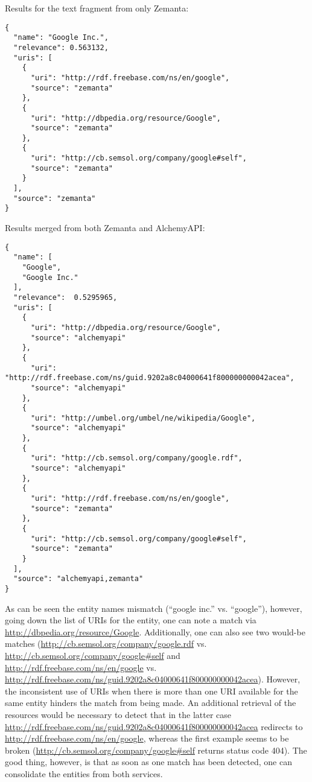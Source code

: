 \documentclass{acm_proc_article-sp}
\begin{document}
Results for the text fragment from only Zemanta:
\begin{lstlisting}
{
  "name": "Google Inc.",
  "relevance": 0.563132,
  "uris": [
    {
      "uri": "http://rdf.freebase.com/ns/en/google",
      "source": "zemanta" 
    },
    {
      "uri": "http://dbpedia.org/resource/Google",
      "source": "zemanta" 
    },
    {
      "uri": "http://cb.semsol.org/company/google#self",
      "source": "zemanta" 
    } 
  ],
  "source": "zemanta" 
}
\end{lstlisting}
Results merged from both Zemanta and AlchemyAPI:
\begin{lstlisting}
{
  "name": [
    "Google",
    "Google Inc."
  ],
  "relevance":  0.5295965,
  "uris": [
    {
      "uri": "http://dbpedia.org/resource/Google",
      "source": "alchemyapi" 
    },
    {
      "uri": "http://rdf.freebase.com/ns/guid.9202a8c04000641f800000000042acea",
      "source": "alchemyapi" 
    },
    {
      "uri": "http://umbel.org/umbel/ne/wikipedia/Google",
      "source": "alchemyapi" 
    },
    {
      "uri": "http://cb.semsol.org/company/google.rdf",
      "source": "alchemyapi" 
    },
    {
      "uri": "http://rdf.freebase.com/ns/en/google",
      "source": "zemanta" 
    },
    {
      "uri": "http://cb.semsol.org/company/google#self",
      "source": "zemanta" 
    } 
  ],
  "source": "alchemyapi,zemanta" 
}
\end{lstlisting}
As can be seen the entity names mismatch (``google inc.'' vs. ``google''), however, going down the list of URIs for the entity, one can note a match via \url{http://dbpedia.org/resource/Google}. Additionally, one can also see two would-be matches (\url{http://cb.semsol.org/company/google.rdf} vs. \url{http://cb.semsol.org/company/google#self} and \url{http://rdf.freebase.com/ns/en/google} vs. \url{http://rdf.freebase.com/ns/guid.9202a8c04000641f800000000042acea}). However, the inconsistent use of URIs when there is more than one URI available for the same entity hinders the match from being made. An additional retrieval of the resources would be necessary to detect that in the latter case \url{http://rdf.freebase.com/ns/guid.9202a8c04000641f800000000042acea} redirects to \url{http://rdf.freebase.com/ns/en/google}, whereas the first example seems to be broken (\url{http://cb.semsol.org/company/google#self} returns status code 404). The good thing, however, is that as soon as one match has been detected, one can consolidate the entities from both services. 
\end{document}
